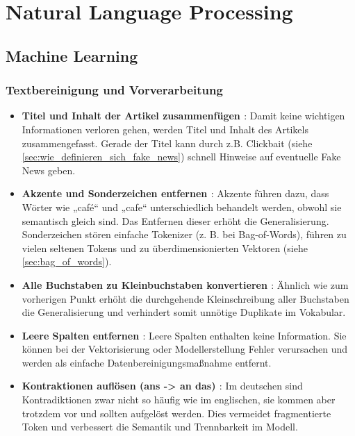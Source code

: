\chapter{Natural Language Processing}
\label{chap:nlp}

\section{Machine Learning}
\label{sec:ml}

\subsection{Textbereinigung und Vorverarbeitung}
\label{sec:text_vorverarbeitung}

\begin{itemize}
    \item \textbf{Titel und Inhalt der Artikel zusammenfügen \cite{Buddhadev2025}}: Damit keine wichtigen Informationen verloren gehen,
    werden Titel und Inhalt des Artikels zusammengefasst. Gerade der Titel kann durch z.B. Clickbait (siehe \ref{sec:wie_definieren_sich_fake_news})
    schnell Hinweise auf eventuelle Fake News geben.

    \item \textbf{Akzente und Sonderzeichen entfernen \cite{Buddhadev2025} \cite{sabir2025} \cite{aslam2022}}: Akzente führen dazu, dass Wörter wie „café“ und „cafe“ unterschiedlich behandelt werden, 
    obwohl sie semantisch gleich sind. Das Entfernen dieser erhöht die Generalisierung. Sonderzeichen stören einfache Tokenizer (z. B. bei Bag-of-Words), führen zu vielen seltenen Tokens und zu 
    überdimensionierten Vektoren (siehe \ref{sec:bag_of_words}).

    \item \textbf{Alle Buchstaben zu Kleinbuchstaben konvertieren \cite{sabir2025} \cite{SUDHAKAR2024101028101028} \cite{aslam2022}}: Ähnlich wie zum vorherigen Punkt
    erhöht die durchgehende Kleinschreibung aller Buchstaben die Generalisierung und verhindert somit unnötige Duplikate im Vokabular.

    \item \textbf{Leere Spalten entfernen \cite{SUDHAKAR2024101028101028}}: Leere Spalten enthalten keine Information. 
    Sie können bei der Vektorisierung oder Modellerstellung Fehler verursachen und werden als einfache Datenbereinigungsmaßnahme entfernt.

    \item \textbf{Kontraktionen auflösen (ans -> an das) \cite{Buddhadev2025}}: Im deutschen sind Kontradiktionen zwar nicht so häufig wie im englischen,
    sie kommen aber trotzdem vor und sollten aufgelöst werden. Dies vermeidet fragmentierte Token und verbessert die Semantik und Trennbarkeit im Modell.


\end{itemize}
